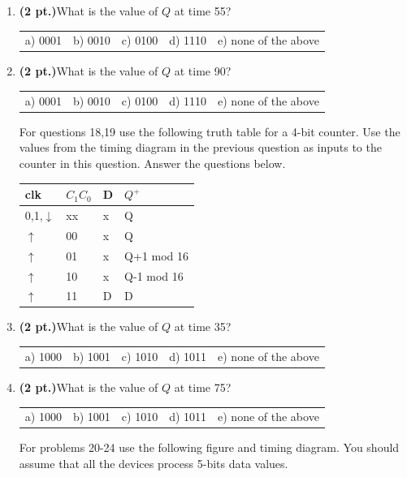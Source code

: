 \documentclass{article}
\begin{document}
\begin{enumerate}
\item {\bf (2 pt.)}What is the value of $Q$ at time 55?

\begin{tabular}{p{0.6in} p{0.6in} p{0.6in} p{0.6in} l}
a) 0001 & b) 0010 & c) 0100 & d) 1110 & e) none of the above
\end{tabular}

\item {\bf (2 pt.)}What is the value of $Q$ at time 90?

\begin{tabular}{p{0.6in} p{0.6in} p{0.6in} p{0.6in} l}
a) 0001 & b) 0010 & c) 0100 & d) 1110 & e) none of the above
\end{tabular}

For questions 18,19 use the following truth table for a 4-bit
counter. Use the values from the timing diagram in the previous
question as inputs to the counter in this question. Answer the 
questions below.

\begin{tabular}{l|l|l||l}
clk             & $C_1 C_0$     & D & $Q^+$     \\ \hline
0,1,$\downarrow$& xx            & x & Q         \\ \hline
$\uparrow$      & 00            & x & Q         \\  \hline
$\uparrow$      & 01            & x & Q+1 mod 16\\  \hline
$\uparrow$      & 10            & x & Q-1 mod 16\\  \hline
$\uparrow$      & 11            & D & D         \\
\end{tabular}

\item {\bf (2 pt.)}What is the value of $Q$ at time 35?

\begin{tabular}{p{0.6in} p{0.6in} p{0.6in} p{0.6in} l}
a) 1000 & b) 1001 & c) 1010 & d) 1011 & e) none of the above
\end{tabular}

\item {\bf (2 pt.)}What is the value of $Q$ at time 75?

\begin{tabular}{p{0.6in} p{0.6in} p{0.6in} p{0.6in} l}
a) 1000 & b) 1001 & c) 1010 & d) 1011 & e) none of the above
\end{tabular}


\pagebreak
For problems 20-24 use the following figure and timing diagram.
You should assume that all the devices process 5-bits data 
values.


\end{enumerate}
\end{document}
